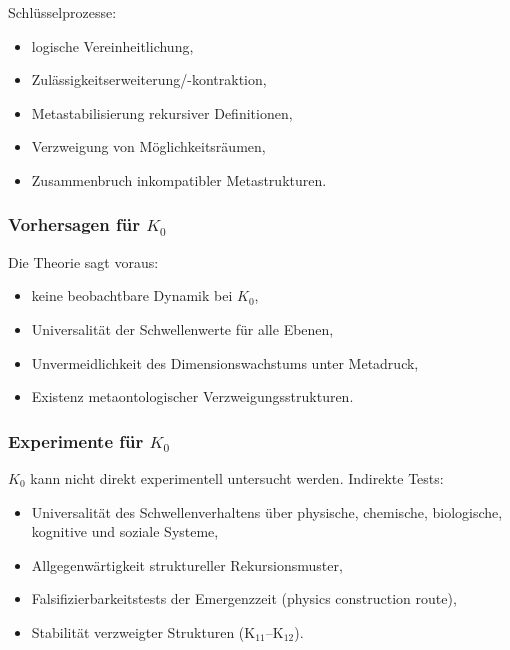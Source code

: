 Schlüsselprozesse:
\begin{itemize}
    \item logische Vereinheitlichung,
    \item Zulässigkeitserweiterung/-kontraktion,
    \item Metastabilisierung rekursiver Definitionen,
    \item Verzweigung von Möglichkeitsräumen,
    \item Zusammenbruch inkompatibler Metastrukturen.
\end{itemize}

\subsubsection{Vorhersagen für \texorpdfstring{$K_0$}{K_0}}

Die Theorie sagt voraus:
\begin{itemize}
    \item keine beobachtbare Dynamik bei $K_0$,
    \item Universalität der Schwellenwerte für alle Ebenen,
    \item Unvermeidlichkeit des Dimensionswachstums unter Metadruck,
    \item Existenz metaontologischer Verzweigungsstrukturen.
\end{itemize}

\subsubsection{Experimente für \texorpdfstring{$K_0$}{K_0}}

$K_0$ kann nicht direkt experimentell untersucht werden.
Indirekte Tests:
\begin{itemize}
    \item Universalität des Schwellenverhaltens über physische,
          chemische, biologische, kognitive und soziale Systeme,
    \item Allgegenwärtigkeit struktureller Rekursionsmuster,
    \item Falsifizierbarkeitstests der Emergenzzeit (physics construction route),
    \item Stabilität verzweigter Strukturen (K$_{11}$–K$_{12}$).
\end{itemize}

